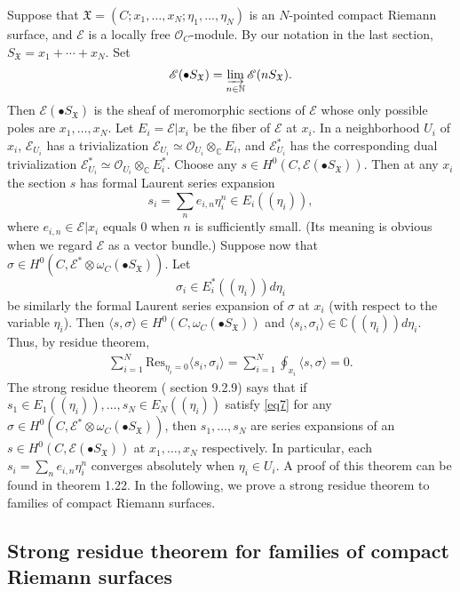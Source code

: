 \documentclass[12pt,a4paper,notitlepage]{report}
\theoremstyle{definition}
\theoremstyle{plain}
\newcommand{\fk}{\mathfrak}
\newcommand{\Res}{\mathrm{Res}}
\newcommand{\bk}[1]{\langle {#1}\rangle}
\newcommand{\scr}{\mathscr}
\newcommand{\SX}{S_{\fk X}}
\numberwithin{equation}{section}
\begin{document}
Suppose that $\fk X=(C;x_1,\dots,x_N;\eta_1,\dots,\eta_N)$ is an $N$-pointed compact Riemann surface, and $\scr E$ is a locally free $\scr O_C$-module. By our notation in the last section, $\SX=x_1+\cdots+x_N$. Set \index{ESX@$\scr E(\bullet\SX)$} 
\begin{align}
\scr E(\bullet\SX)=\varinjlim_{n\in\mathbb N}\scr E(n\SX).\label{eq9}
\end{align}
Then $\scr E(\bullet\SX)$ is the sheaf of meromorphic sections of $\scr E$ whose only possible poles are $x_1,\dots,x_N$. Let $E_i=\scr E|x_i$ be the fiber of $\scr E$ at $x_i$. In a neighborhood $U_i$ of $x_i$, $\scr E_{U_i}$ has a trivialization $\scr E_{U_i}\simeq\scr O_{U_i}\otimes_{\mathbb C}E_i$, and  $\scr E^*_{U_i}$ has the corresponding dual trivialization $\scr E^*_{U_i}\simeq\scr O_{U_i}\otimes_{\mathbb C}E_i^*$. Choose any $s\in H^0(C,\scr E(\bullet\SX))$.  Then at any $x_i$ the section $s$ has formal Laurent series expansion
$$s_i=\sum_n e_{i,n}\eta_i^n\in E_i((\eta_i)),$$
where $e_{i,n}\in\scr E|x_i$ equals $0
$ when $n$ is sufficiently small.  (Its meaning is obvious when we regard $\scr E$ as a vector bundle.) Suppose now that $\sigma\in H^0(C,\scr E^*\otimes\omega_C(\bullet\SX))$. Let
$$\sigma_i\in E_i^*((\eta_i))d\eta_i$$
be similarly the formal Laurent series expansion of $\sigma$ at $x_i$ (with respect to the variable $\eta_i$). Then $\bk{s,\sigma}\in H^0(C,\omega_C(\bullet\SX))$ and $\bk{s_i,\sigma_i}\in\mathbb C((\eta_i))d\eta_i$. Thus, by residue theorem,
\begin{align}
\sum_{i=1}^N\Res_{\eta_i=0}\bk{s_i,\sigma_i}=\sum_{i=1}^N\oint_{x_i}\bk{s,\sigma}=0.\label{eq7}
\end{align}
The strong residue theorem  (\cite{FB04} section 9.2.9) says that if $s_1\in E_1((\eta_i)),\dots,s_N\in E_N((\eta_i))$ satisfy \eqref{eq7} for any  $\sigma\in H^0(C,\scr E^*\otimes\omega_C(\bullet\SX))$, then $s_1,\dots,s_N$ are series expansions of an $s\in H^0(C,\scr E(\bullet\SX))$ at $x_1,\dots,x_N$ respectively. In particular, each  $s_i=\sum_n e_{i,n}\eta_i^n$ converges absolutely when $\eta_i\in U_i$. A proof of this theorem can be found in \cite{Ueno08} theorem 1.22. In the following, we prove a strong residue theorem to families of compact Riemann surfaces.

\subsection*{Strong residue theorem for families of compact Riemann surfaces}
\end{document}
